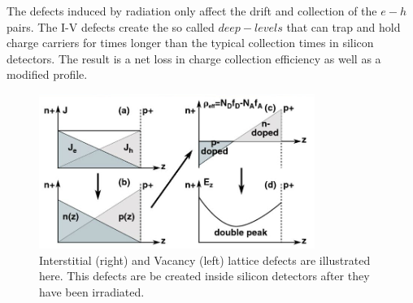

The defects induced by radiation only affect the drift and collection of the $e-h$ pairs. The I-V defects create the so called $deep-levels$ that can trap and hold charge carriers for times longer than the typical collection times in silicon detectors. The result is a net loss in charge collection efficiency as well as a modified \neff profile.

\begin{figure}[H]
	\centering
	\includegraphics[width=0.8\textwidth]{chap3_erem.jpg}
	\caption{Interstitial (right) and Vacancy (left) lattice defects are illustrated here. This defects are be created inside silicon detectors after they have been irradiated.}
	\label{fig:Eremin}
\end{figure}

